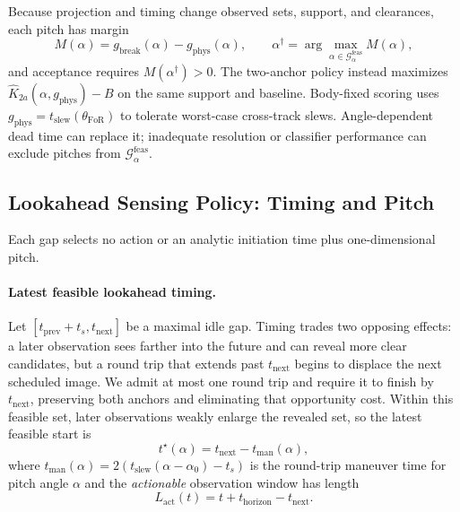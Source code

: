 Because projection and timing change observed sets, support, and clearances, each pitch has margin
\begin{equation}
M(\alpha)
= g_{\mathrm{break}}(\alpha) - g_{\mathrm{phys}}(\alpha),
\qquad
\alpha^\dagger = \arg\max_{\alpha \in \mathcal{G}_{\alpha}^{\mathrm{feas}}} M(\alpha),
\label{eq:break_even_margin}
\end{equation}
and acceptance requires $M(\alpha^\dagger)>0$. The two-anchor policy instead maximizes $\widehat{K}_{2a}(\alpha,g_{\mathrm{phys}})-B$ on the same support and baseline. Body-fixed scoring uses $g_{\mathrm{phys}}=t_{\mathrm{slew}}(\theta_{\mathrm{FoR}})$ to tolerate worst-case cross-track slews. Angle-dependent dead time can replace it; inadequate resolution or classifier performance can exclude pitches from $\mathcal{G}_{\alpha}^{\mathrm{feas}}$.

\subsection{Lookahead Sensing Policy: Timing and Pitch}
\label{sec:lookahead_policy}

Each gap selects no action or an analytic initiation time plus one-dimensional pitch.

\paragraph{Latest feasible lookahead timing.}
\label{sec:timing}
Let $[t_{\mathrm{prev}}+t_s,t_{\mathrm{next}}]$ be a maximal idle gap.
Timing trades two opposing effects: a later observation sees farther into the future and can reveal more clear candidates, but a round trip that extends past $t_{\mathrm{next}}$ begins to displace the next scheduled image.
We admit at most one round trip and require it to finish by $t_{\mathrm{next}}$, preserving both anchors and eliminating that opportunity cost.
Within this feasible set, later observations weakly enlarge the revealed set, so the latest feasible start is
\begin{equation}
t^\star(\alpha) = t_{\mathrm{next}} - t_{\mathrm{man}}(\alpha),
\label{eq:optimal_timing}
\end{equation}
where $t_{\mathrm{man}}(\alpha) = 2(t_{\mathrm{slew}}(\alpha - \alpha_0) - t_s)$ is the round-trip maneuver time for pitch angle $\alpha$ and the \emph{actionable} observation window has length
\begin{equation}
L_{\mathrm{act}}(t) = t + t_{\mathrm{horizon}} - t_{\mathrm{next}}.
\label{eq:actionable_window}
\end{equation}

